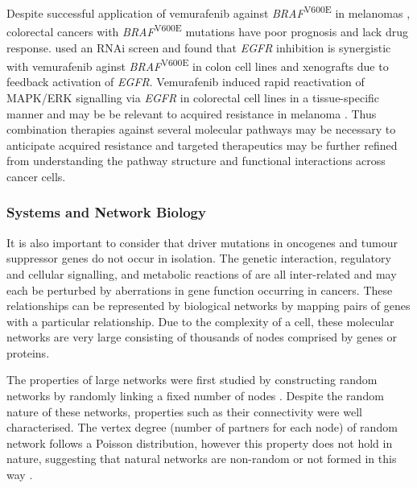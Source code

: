 Despite successful application of vemurafenib against \textit{BRAF}\textsuperscript{V600E} in melanomas \citet{Dienstmann2011, Ravnan2012}, colorectal cancers with \textit{BRAF}\textsuperscript{V600E} mutations have poor prognosis and lack drug response. \citet{Prahallad2012} used an \gls{RNAi} screen and found that \textit{EGFR} inhibition is synergistic with vemurafenib aginst \textit{BRAF}\textsuperscript{V600E} in colon cell lines and xenografts due to feedback activation of \textit{EGFR}. Vemurafenib induced rapid reactivation of MAPK/ERK signalling via \textit{EGFR} in colorectal cell lines in a tissue-specific manner \citet{Corcoran2012} and may be be relevant to acquired resistance in melanoma \citet{Sun2014}. Thus combination therapies against several molecular pathways may be necessary to anticipate acquired resistance \citet{Ravnan2012} and targeted therapeutics may be further refined from understanding the pathway structure and functional interactions across cancer cells.

\subsubsection{Systems and Network Biology}

It is also important to consider that driver mutations in oncogenes and tumour suppressor genes do not occur in isolation. The genetic interaction, regulatory and cellular signalling, and metabolic reactions of are all inter-related and may each be perturbed by aberrations in gene function occurring in cancers. These relationships can be represented by biological networks by mapping pairs of genes with a particular relationship. Due to the complexity of a cell, these molecular networks are very large consisting of thousands of nodes comprised by genes or proteins. 

The properties of large networks were first studied by constructing random networks by randomly linking a fixed number of nodes \citep{Erdos1959, Erdos1960}. Despite the random nature of these networks, properties such as their connectivity were well characterised. The vertex degree (number of partners for each node) of random network follows a Poisson distribution, however this property does not hold in nature, suggesting that natural networks are non-random or not formed in this way \citet{Barabasi2004}. 

